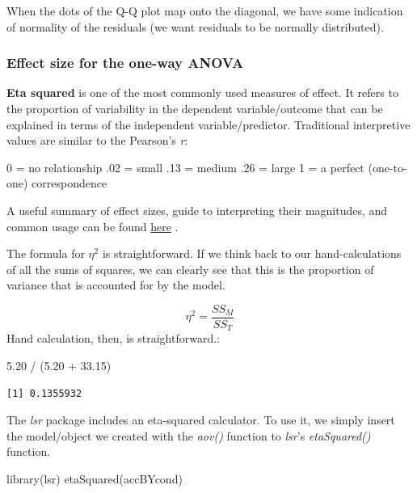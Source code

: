 \documentclass[
  english,
]{book}
\newenvironment{Shaded}{\begin{snugshade}}{\end{snugshade}}
\newcommand{\FloatTok}[1]{\textcolor[rgb]{0.00,0.00,0.81}{#1}}
\newcommand{\FunctionTok}[1]{\textcolor[rgb]{0.00,0.00,0.00}{#1}}
\newcommand{\NormalTok}[1]{#1}
\newcommand{\SpecialCharTok}[1]{\textcolor[rgb]{0.00,0.00,0.00}{#1}}
\begin{document}
When the dots of the Q-Q plot map onto the diagonal, we have some indication of normality of the residuals (we want residuals to be normally distributed).

\hypertarget{effect-size-for-the-one-way-anova}{%
\subsubsection{Effect size for the one-way ANOVA}\label{effect-size-for-the-one-way-anova}}

\textbf{Eta squared} is one of the most commonly used measures of effect. It refers to the proportion of variability in the dependent variable/outcome that can be explained in terms of the independent variable/predictor. Traditional interpretive values are similar to the Pearson's \emph{r}:

0 = no relationship
.02 = small
.13 = medium
.26 = large
1 = a perfect (one-to-one) correspondence

A useful summary of effect sizes, guide to interpreting their magnitudes, and common usage can be found \href{https://imaging.mrc-cbu.cam.ac.uk/statswiki/FAQ/effectSize}{here} \citep{watson_rules_2020}.

The formula for \(\eta^2\) is straightforward. If we think back to our hand-calculations of all the sums of squares, we can clearly see that this is the proportion of variance that is accounted for by the model.

\[\eta ^{2}=\frac{SS_{M}}{SS_{T}}\]
Hand calculation, then, is straightforward.:

\begin{Shaded}
\begin{Highlighting}[]
\FloatTok{5.20} \SpecialCharTok{/}\NormalTok{ (}\FloatTok{5.20} \SpecialCharTok{+} \FloatTok{33.15}\NormalTok{)}
\end{Highlighting}
\end{Shaded}

\begin{verbatim}
[1] 0.1355932
\end{verbatim}

The \emph{lsr} package includes an eta-squared calculator. To use it, we simply insert the model/object we created with the \emph{aov()} function to \emph{lsr}'s \emph{etaSquared()} function.

\begin{Shaded}
\begin{Highlighting}[]
\FunctionTok{library}\NormalTok{(lsr)}
\FunctionTok{etaSquared}\NormalTok{(accBYcond)}
\end{Highlighting}
\end{Shaded}
\end{document}
